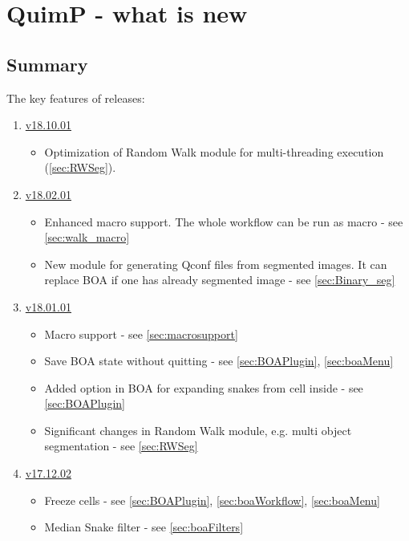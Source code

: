 \documentclass[a4paper,12pt]{article}
\begin{document}
\section{QuimP - what is new}

\subsection{Summary}
The key features of releases:
\begin{enumerate}
	\item \href{https://pilip.lnx.warwick.ac.uk/site/changes-report.html#a18.10.01}{v18.10.01}
	\begin{itemize}
		\item Optimization of Random Walk module for multi-threading execution (\autoref{sec:RWSeg}).
	\end{itemize}
	\item \href{https://pilip.lnx.warwick.ac.uk/site/changes-report.html#a18.02.01}{v18.02.01}
	\begin{itemize}
		\item Enhanced macro support. The whole workflow can be run as macro - see \autoref{sec:walk_macro}
		\item New module for generating Qconf files from segmented images. It can replace BOA if one has already segmented image - see \autoref{sec:Binary_seg} 
	\end{itemize}
	\item \href{https://pilip.lnx.warwick.ac.uk/site/changes-report.html#a18.01.01}{v18.01.01}
	\begin{itemize}
		\item Macro support - see \autoref{sec:macrosupport}
		\item Save BOA state without quitting - see \autoref{sec:BOAPlugin}, \autoref{sec:boaMenu}
		\item Added option in BOA for expanding snakes from cell inside - see \autoref{sec:BOAPlugin}
		\item Significant changes in Random Walk module, e.g. multi object segmentation - see \autoref{sec:RWSeg} 
	\end{itemize}
	\item \href{https://pilip.lnx.warwick.ac.uk/site/changes-report.html#a17.12.02}{v17.12.02}
	\begin{itemize}
		\item Freeze cells - see \autoref{sec:BOAPlugin}, \autoref{sec:boaWorkflow}, \autoref{sec:boaMenu}
		\item Median Snake filter - see \autoref{sec:boaFilters}

\end{itemize}
\end{enumerate}
\end{document}
